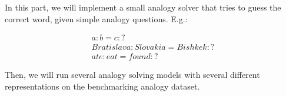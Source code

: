 In this part, we will implement a small analogy solver that tries to guess the correct word, given simple analogy questions. E.g.:

\begin{align*}
	a : b = c : ?\\
	Bratislava : Slovakia = Bishkek : ?\\
	ate : eat = found : ?
\end{align*}

Then, we will run several analogy solving models with several different representations on the benchmarking analogy dataset.

